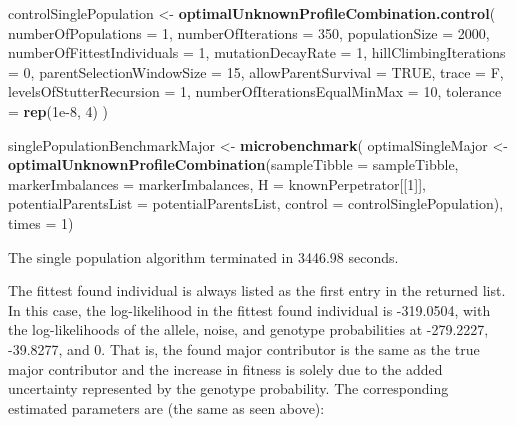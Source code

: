 \documentclass[]{article}
\newenvironment{Shaded}{\begin{snugshade}}{\end{snugshade}}
\newcommand{\KeywordTok}[1]{\textcolor[rgb]{0.13,0.29,0.53}{\textbf{#1}}}
\newcommand{\DataTypeTok}[1]{\textcolor[rgb]{0.13,0.29,0.53}{#1}}
\newcommand{\DecValTok}[1]{\textcolor[rgb]{0.00,0.00,0.81}{#1}}
\newcommand{\FloatTok}[1]{\textcolor[rgb]{0.00,0.00,0.81}{#1}}
\newcommand{\StringTok}[1]{\textcolor[rgb]{0.31,0.60,0.02}{#1}}
\newcommand{\OtherTok}[1]{\textcolor[rgb]{0.56,0.35,0.01}{#1}}
\newcommand{\NormalTok}[1]{#1}
\begin{document}
\begin{Shaded}
\begin{Highlighting}[]
\NormalTok{controlSinglePopulation <-}\StringTok{  }
\StringTok{    }\KeywordTok{optimalUnknownProfileCombination.control}\NormalTok{(}
        \DataTypeTok{numberOfPopulations =} \DecValTok{1}\NormalTok{, }\DataTypeTok{numberOfIterations =} \DecValTok{350}\NormalTok{,}
        \DataTypeTok{populationSize =} \DecValTok{2000}\NormalTok{, }\DataTypeTok{numberOfFittestIndividuals =} \DecValTok{1}\NormalTok{,}
        \DataTypeTok{mutationDecayRate =} \DecValTok{1}\NormalTok{, }\DataTypeTok{hillClimbingIterations =} \DecValTok{0}\NormalTok{, }
        \DataTypeTok{parentSelectionWindowSize =} \DecValTok{15}\NormalTok{,}
        \DataTypeTok{allowParentSurvival =} \OtherTok{TRUE}\NormalTok{, }\DataTypeTok{trace =}\NormalTok{ F, }
        \DataTypeTok{levelsOfStutterRecursion =} \DecValTok{1}\NormalTok{, }
        \DataTypeTok{numberOfIterationsEqualMinMax =} \DecValTok{10}\NormalTok{, }
        \DataTypeTok{tolerance =} \KeywordTok{rep}\NormalTok{(}\FloatTok{1e-8}\NormalTok{, }\DecValTok{4}\NormalTok{)}
\NormalTok{    )}

\NormalTok{singlePopulationBenchmarkMajor <-}\StringTok{ }\KeywordTok{microbenchmark}\NormalTok{(}
\NormalTok{    optimalSingleMajor <-}\StringTok{ }
\StringTok{        }\KeywordTok{optimalUnknownProfileCombination}\NormalTok{(}\DataTypeTok{sampleTibble =}\NormalTok{ sampleTibble, }
                                         \DataTypeTok{markerImbalances =}\NormalTok{ markerImbalances, }
                                         \DataTypeTok{H =}\NormalTok{ knownPerpetrator[[}\DecValTok{1}\NormalTok{]], }
                                         \DataTypeTok{potentialParentsList =}\NormalTok{ potentialParentsList, }
                                         \DataTypeTok{control =}\NormalTok{ controlSinglePopulation),}
    \DataTypeTok{times =} \DecValTok{1}\NormalTok{)}
\end{Highlighting}
\end{Shaded}

The single population algorithm terminated in 3446.98 seconds.

The fittest found individual is always listed as the first entry in the
returned list. In this case, the log-likelihood in the fittest found
individual is -319.0504, with the log-likelihoods of the allele, noise,
and genotype probabilities at -279.2227, -39.8277, and 0. That is, the
found major contributor is the same as the true major contributor and
the increase in fitness is solely due to the added uncertainty
represented by the genotype probability. The corresponding estimated
parameters are (the same as seen above):
\end{document}
